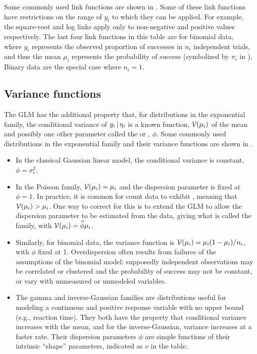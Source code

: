 \documentclass[11pt]{book}\usepackage[]{graphicx}\usepackage[]{color}
\begin{document}


Some commonly used link functions are shown in .
Some of these link functions have restrictions on the range of $y_i$
to which they can be applied.  For example, the square-root and log links
apply only to non-negative and
positive values respectively.
The last four link functions in this
table are for binomial data, where $y_i$ represents the observed proportion
of successes in $n_i$ independent trials, and thus the mean $\mu_i$
represents the probability of success (symbolized by $\pi_i$ in ).
Binary data are the special case where $n_i=1$.

\subsection{Variance functions}
The GLM has the additional property that, for distributions in the exponential family,
the conditional variance of $y_i \, | \, \eta_i$ is a known function, $\mathcal{V} (\mu_i)$
of the mean and possibly one other parameter called the  or
, $\phi$. Some commonly used distributions in the
exponential family and their variance functions are shown in .



\begin{itemize}
\item In the classical Gaussian linear model, the conditional variance is constant,
$\phi = \sigma^2_\epsilon$.

\item In the Poisson family, $\mathcal{V} (\mu_i) = \mu_i$
and the dispersion parameter is fixed at $\phi = 1$.
In practice, it is common for count data to exhibit ,
meaning that $\mathcal{V} (\mu_i) > \mu_i$.  One way to correct for this is to extend
the GLM to allow the dispersion parameter to be estimated from the data,
giving what is called the  family, with $\mathcal{V} (\mu_i) = \widehat{\phi} \mu_i$.

\item Similarly, for binomial data, the variance function is $\mathcal{V} (\mu_i) = \mu_i (1-\mu_i) / n_i$,
with $\phi$ fixed at 1.
Overdispersion often results from failures of the assumptions of the binomial model:
supposedly independent observations may be correlated or clustered and the probability
of success may not be constant, or vary with unmeasured or unmodeled variables.

\item The gamma and inverse-Gaussian families are distributions useful for modeling a continuous
and positive response variable with no upper bound (e.g., reaction time). They both have the
property that conditional variance increases with the mean, and for the inverse-Gaussian,
variance increases at a faster rate.  Their dispersion parameters $\phi$ are simple functions
of their intrinsic ``shape'' parameters, indicated as $\nu$ in the table.

\end{itemize}
\end{document}

